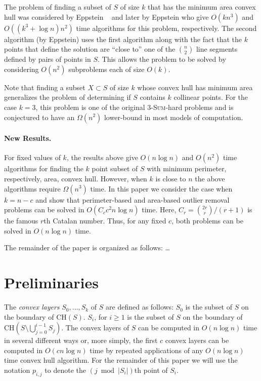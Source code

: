 \documentclass[lotsofwhite]{patmorin}
\newcommand{\ch}{\mathrm{CH}}
\newcommand{\ntypes}{C_c}
\newcommand{\timepertype}{c^2 n\log n}
\newcommand{\runtime}{\ntypes \timepertype}
\begin{document}
The problem of finding a subset of $S$ of size $k$ that has the
minimum area convex hull was considered by Eppstein \etal\
\cite{eorw92} and later by Eppstein \cite{e93} who give $O(kn^{3})$
and $O((k^3+\log n) n^2)$ time algorithms for this problem,
respectively.  The second algorithm (by Eppstein) uses the first
algorithm along with the fact that the $k$ points that define the
solution are ``close to'' one of the $n\choose 2$ line segments
defined by pairs of points in $S$.  This allows the problem to be
solved by considering $O(n^2)$ subproblems each of size $O(k)$.

Note that finding a subset $X\subset S$ of size $k$ whose convex hull has
minimum area generalizes the problem of determining if $S$ contains $k$
collinear points.  For the case $k=3$, this problem is one of the original
\textsc{3-Sum}-hard problems \cite{X} and is conjectured to have an
$\Omega(n^2)$ lower-bound in most models of computation.

\paragraph{New Results.}

For fixed values of $k$, the results above give $O(n\log n)$ and
$O(n^2)$ time algorithms for finding the $k$ point subset of $S$ with
minimum perimeter, respectively, area, convex hull.  However, when $k$
is close to $n$ the above algorithms require $\Omega(n^3)$ time.  In
this paper we consider the case when $k=n-c$ and show that
perimeter-based and area-based outlier removal problems can be solved
in $O(\runtime)$ time.  Here, $C_r={2r \choose r}/(r+1)$ is the famous
$r$th Catalan number.  Thus, for any fixed $c$, both problems can be
solved in $O(n\log n)$ time.

The remainder of the paper is organized as follows: \ldots

\section{Preliminaries}

The \emph{convex layers} $S_0,\ldots,S_k$ of $S$ are defined as
follows: $S_0$ is the subset of $S$ on the boundary of $\ch(S)$.
$S_i$, for $i\ge 1$ is the subset of $S$ on the boundary of
$\ch(S\setminus\bigcup_{j=0}^{i-1} S_j)$.  The convex layers of $S$
can be computed in $O(n\log n)$ time in several different ways
\cite{X,Y,Z} or, more simply, the first $c$ convex layers can be
computed in $O(cn\log n)$ time by repeated applications of any
$O(n\log n)$ time convex hull algorithm.  For the remainder of this
paper we will use the notation $p_{i,j}$ to denote the $(j\bmod
|S_i|)$th point of $S_i$.
\end{document}
